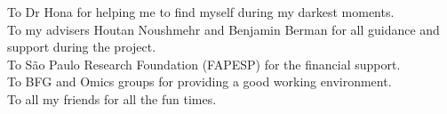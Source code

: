 
To Dr Hona for helping me to find myself during my darkest moments.\\

To my advisers Houtan Noushmehr and Benjamin Berman for all guidance and support during the project.\\

To São Paulo Research Foundation (FAPESP) for the financial support.\\

To BFG and Omics groups for providing a good working environment.\\

To all my friends for all the fun times.\\